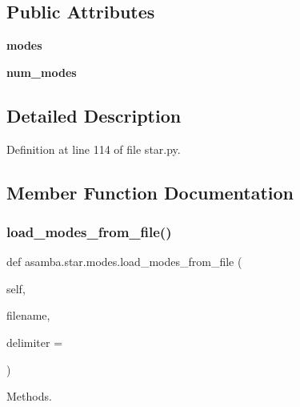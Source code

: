 \subsection*{Public Attributes}
\begin{DoxyCompactItemize}
\item 
\mbox{\label{classasamba_1_1star_1_1modes_a876e916c49eba64dc7cff4997a486000}} 
{\bfseries modes}
\item 
\mbox{\label{classasamba_1_1star_1_1modes_a2a36ba9c82cc7c23db125cfcdd2bf1d7}} 
{\bfseries num\+\_\+modes}
\end{DoxyCompactItemize}


\subsection{Detailed Description}


Definition at line 114 of file star.\+py.



\subsection{Member Function Documentation}
\mbox{\label{classasamba_1_1star_1_1modes_a5164b765f3ed46300e4c5a1970f2c784}} 
\subsubsection{\texorpdfstring{load\+\_\+modes\+\_\+from\+\_\+file()}{load\_modes\_from\_file()}}
{\footnotesize\ttfamily def asamba.\+star.\+modes.\+load\+\_\+modes\+\_\+from\+\_\+file (\begin{DoxyParamCaption}\item[{}]{self,  }\item[{}]{filename,  }\item[{}]{delimiter = {\ttfamily \textquotesingle{}\textquotesingle{}} }\end{DoxyParamCaption})}



Methods. 

